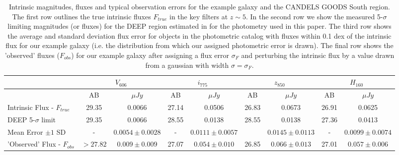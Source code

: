 \begin{table}
    \centering
    \label{tab:eg_photom}
    \caption{Intrinsic magnitudes, fluxes and typical observation errors for the example galaxy and the CANDELS GOODS South region. The first row outlines the true intrinsic fluxes $F_{true}$ in the key filters at $z\sim5$. In the second row we show the measured 5-$\sigma$ limiting magnitudes (or fluxes) for the DEEP region estimated in \citet{Guo:2013ig} for the photometry used in this paper. The third row shows the average and standard deviation flux error for objects in the photometric catalog \citep{Guo:2013ig} with fluxes within 0.1 dex of the intrinsic flux for our example galaxy (i.e. the distribution from which our assigned photometric error is drawn). The final row shows the 'observed' fluxes ($F_{obs}$) for our example galaxy after assigning a flux error $\sigma_{F}$ and perturbing the intrinsic flux by a value drawn from a gaussian with width $\sigma = \sigma_{F}$.}
    \begin{tabular}{lcccccccc}
    \hline
    ~                      & \multicolumn{2}{c}{$V_{606}$} & \multicolumn{2}{c}{$i_{775}$} & \multicolumn{2}{c}{$z_{850}$} & \multicolumn{2}{c}{$H_{160}$} \\ \hline
    ~                      & AB        & $\mu Jy$ & AB & $\mu Jy$ & AB & $\mu Jy$ & AB   & $\mu Jy$ \\ \hline
    Intrinsic Flux - $F_{true}$           & 29.35         & 0.0066   & 27.14  & 0.0506  & 26.83  & 0.0673 & 26.91 &  0.0625  \\
    DEEP 5-$\sigma$ limit   & 29.35        & 0.0066   & 28.55  & 0.0138  & 28.55  & 0.0138 & 27.36 &  0.0413   \\
    Mean Error $\pm 1$ SD  & -         & $0.0054\pm0.0028$    & -  & $0.0111 \pm  0.0057$  &   & $0.0145 \pm 0.0113$   &   -   & $0.0099 \pm 0.0074$ \\ 
    'Observed' Flux - $F_{obs}$  & $>27.82$     & $0.009 \pm 0.009$  & 27.07  & $0.054\pm0.010$  & 26.85 & $0.066\pm0.013$   & 27.01        & $0.057 \pm 0.006$   \\
    \hline
    \end{tabular}
\end{table}
 
